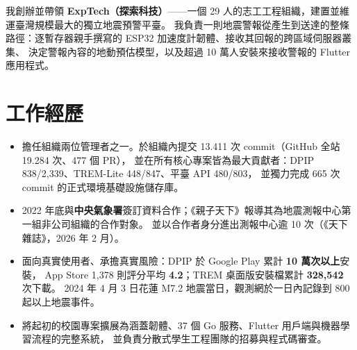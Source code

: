 \documentclass[10pt,a4paper]{article}
\begin{document}

\vspace{7pt}
{\fontsize{9.4}{13.6}\selectfont
我創辦並帶領 \textbf{ExpTech（探索科技）}——一個 29 人的志工工程組織，建置並維運臺灣規模最大的獨立地震預警平臺。
我負責一則地震警報從產生到送達的整條路徑：逐暫存器親手撰寫的 ESP32 加速度計韌體、接收其回報的跨區域伺服器叢集、
決定警報內容的地動預估模型，以及超過 10 萬人安裝來接收警報的 Flutter 應用程式。
\par}

\section{工作經歷}

\begin{itemize}
  \item 擔任組織兩位管理者之一。於組織內提交 \num{13,411} 次 commit（GitHub 全站 \num{19,284} 次、\num{477} 個 PR），
        並在所有核心專案皆為最大貢獻者：DPIP \num{838}/2,339、TREM-Lite \num{448}/847、平臺 API \num{480}/803，
        並獨力完成 665 次 commit 的正式環境基礎設施儲存庫。
  \item 2022 年底與\textbf{中央氣象署}簽訂資料合作；《親子天下》報導其為地震測報中心第一組非公司組織的合作對象。
        並以合作者身分進出測報中心逾 10 次（《天下雜誌》，2026 年 2 月）。
  \item 面向真實使用者、承擔真實風險：DPIP 於 Google Play 累計 \textbf{10 萬次以上}安裝，
        App Store 1,378 則評分平均 \textbf{4.2}；TREM 桌面版安裝檔累計 \textbf{328,542} 次下載。
        2024 年 4 月 3 日花蓮 M7.2 地震當日，觀測網於一日內記錄到 800 起以上地震事件。
  \item 將起初的校園專案擴展為涵蓋韌體、37 個 Go 服務、Flutter 用戶端與機器學習流程的完整系統，
        並負責分散式學生工程團隊的招募與程式碼審查。
\end{itemize}
\end{document}

